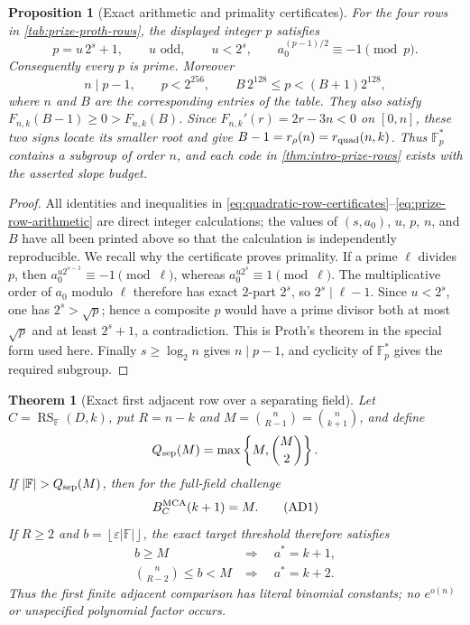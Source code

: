 \documentclass[11pt,a4paper]{amsart}
\numberwithin{equation}{section}
\newtheorem{theorem}{Theorem}[section]
\newtheorem{proposition}[proposition]{Proposition}
\theoremstyle{remark}
\DeclareMathOperator{\RS}{RS}
\newcommand{\F}{\mathbb F}
\newcommand{\eps}{\varepsilon}
\newcommand{\abs}[1]{\lvert #1\rvert}
\newcommand{\floor}[1]{\left\lfloor #1\right\rfloor}
\begin{document}
\begin{proposition}[Exact arithmetic and primality certificates]
\label{prop:proth-row-check}
For the four rows in \cref{tab:prize-proth-rows}, the displayed integer
\(p\) satisfies
\[
 p=u\,2^s+1,\qquad u\text{ odd},\qquad u<2^s,\qquad
 a_0^{(p-1)/2}\equiv-1\pmod p.                  \tag{PC1}
\label{eq:proth-certificates}
\]
Consequently every \(p\) is prime.  Moreover
\[
 n\mid p-1,\qquad p<2^{256},\qquad
 B\,2^{128}\le p<(B+1)2^{128},                  \tag{PC2}
\label{eq:prize-row-arithmetic}
\]
where \(n\) and \(B\) are the corresponding entries of the table.
They also satisfy \(F_{n,k}(B-1)\ge0>F_{n,k}(B)\).  Since
\(F_{n,k}'(r)=2r-3n<0\) on \([0,n]\), these two signs locate its smaller
root and give \(B-1=r_\rho(n)=r_{\rm quad}(n,k)\).
Thus \(\F_p^*\) contains a subgroup of order \(n\), and each code in
\cref{thm:intro-prize-rows} exists with the asserted slope budget.
\end{proposition}

\begin{proof}
All identities and inequalities in
\eqref{eq:quadratic-row-certificates}--\eqref{eq:prize-row-arithmetic}
are direct
integer calculations; the values of \((s,a_0)\), \(u\), \(p\), \(n\),
and \(B\) have all been printed above so that the calculation is
independently reproducible.  We recall why the certificate proves
primality.  If a prime \(\ell\) divides \(p\), then
\(a_0^{u2^{s-1}}\equiv-1\pmod\ell\), whereas
\(a_0^{u2^s}\equiv1\pmod\ell\).  The multiplicative order of \(a_0\)
modulo \(\ell\) therefore has exact \(2\)-part \(2^s\), so
\(2^s\mid\ell-1\).  Since \(u<2^s\), one has \(2^s>\sqrt p\); hence a
composite \(p\) would have a prime divisor both at most \(\sqrt p\) and
at least \(2^s+1\), a contradiction.  This is Proth's theorem in the
special form used here.  Finally \(s\ge\log_2 n\) gives \(n\mid p-1\),
and cyclicity of \(\F_p^*\) gives the required subgroup.
\end{proof}

\begin{theorem}[Exact first adjacent row over a separating field]
\label{thm:exact-first-adjacent-row}
Let \(C=\RS_\F(D,k)\), put \(R=n-k\) and
\(M=\binom n{R-1}=\binom n{k+1}\), and define
\[
                    Q_{\rm sep}(M)=\max\left\{M,\binom M2\right\}.
\]
If \(\abs\F>Q_{\rm sep}(M)\), then for the full-field challenge
\[
                         B_C^{\rm MCA}(k+1)=M.      \tag{AD1}
\]
If \(R\ge2\) and \(b=\floor{\eps\abs\F}\), the exact target threshold
therefore satisfies
\[
 \begin{array}{ll}
 b\ge M &\Longrightarrow\quad a^*=k+1,\\[2mm]
 \displaystyle\binom n{R-2}\le b<M
   &\Longrightarrow\quad a^*=k+2.
 \end{array}                                       \tag{AD2}
\]
Thus the first finite adjacent comparison has literal binomial constants;
no \(e^{o(n)}\) or unspecified polynomial factor occurs.
\end{theorem}
\end{document}
